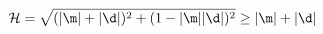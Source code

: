 \begin{equation}
{\cal H}=\sqrt{(|\m |+|\d |)^2+(1-|\m ||\d |)^2}\ge |\m |+|\d |
\label{bi7}
\end{equation}

